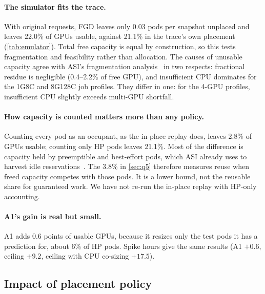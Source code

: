 \documentclass[10pt]{article}
\newcommand{\finding}[1]{\paragraph{#1}}
\begin{document}
\finding{The simulator fits the trace.} With original requests, FGD leaves only 0.03 pods per snapshot unplaced and leaves 22.0\% of GPUs usable, against 21.1\% in the trace's own placement (\cref{tab:emulator}). Total free capacity is equal by construction, so this tests fragmentation and feasibility rather than allocation. The causes of unusable capacity agree with ASI's fragmentation analysis~\citep{li2026asi} in two respects: fractional residue is negligible (0.4--2.2\% of free GPU), and insufficient CPU dominates for the 1G8C and 8G128C job profiles. They differ in one: for the 4-GPU profiles, insufficient CPU slightly exceeds multi-GPU shortfall.

\finding{How capacity is counted matters more than any policy.} Counting every pod as an occupant, as the in-place replay does, leaves 2.8\% of GPUs usable; counting only HP pods leaves 21.1\%. Most of the difference is capacity held by preemptible and best-effort pods, which ASI already uses to harvest idle reservations~\citep{li2026asi}. The 3.8\% in \cref{sec:q5} therefore measures reuse when freed capacity competes with those pods. It is a lower bound, not the reusable share for guaranteed work. We have not re-run the in-place replay with HP-only accounting.

\finding{A1's gain is real but small.} A1 adds 0.6 points of usable GPUs, because it resizes only the test pods it has a prediction for, about 6\% of HP pods. Spike hours give the same results (A1 $+0.6$, ceiling $+9.2$, ceiling with CPU co-sizing $+17.5$).

\subsection{Impact of placement policy}
\label{sec:q7}
\end{document}
